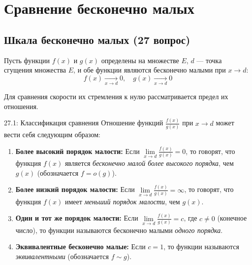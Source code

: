 \documentclass[a4paper,12pt]{article}
\begin{document}
	
	
	
	
	
	
	
	\newpage
	\section{Сравнение бесконечно малых}
	
	\subsection{Шкала бесконечно малых (27 вопрос)}
	
	Пусть функции $f(x)$ и $g(x)$ определены на множестве $E$, $d$ — точка сгущения множества $E$, и обе функции являются бесконечно малыми при $x \to d$:
	\[ f(x) \xrightarrow[x \to d]{} 0, \quad g(x) \xrightarrow[x \to d]{} 0 \]
	
	Для сравнения скорости их стремления к нулю рассматривается предел их отношения.
	
	\begin{definitionbox}{27.1: Классификация сравнения}
		Отношение функций $\frac{f(x)}{g(x)}$ при $x \to d$ может вести себя следующим образом:
		
		\begin{enumerate}
			\item \textbf{Более высокий порядок малости:}
			Если $\lim\limits_{x \to d} \frac{f(x)}{g(x)} = 0$, то говорят, что функция $f(x)$ является \textit{бесконечно малой более высокого порядка}, чем $g(x)$ (обозначается $f = o(g)$).
			
			\item \textbf{Более низкий порядок малости:}
			Если $\lim\limits_{x \to d} \frac{f(x)}{g(x)} = \infty$, то говорят, что функция $f(x)$ имеет \textit{меньший порядок малости}, чем $g(x)$.
			
			\item \textbf{Один и тот же порядок малости:}
			Если $\lim\limits_{x \to d} \frac{f(x)}{g(x)} = c$, где $c \neq 0$ (конечное число), то функции называются бесконечно малыми \textit{одного порядка}.
			
			\item \textbf{Эквивалентные бесконечно малые:}
			Если $c = 1$, то функции называются \textit{эквивалентными} (обозначается $f \sim g$).
		\end{enumerate}
	\end{definitionbox}
	
\end{document}
